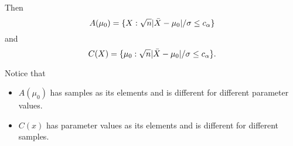\begin{itemize}
\begin{ex}
    Then
    \begin{equation*}
      A(\mu_0) = \{X : \sqrt{n} |\bar{X} - \mu_0| / \sigma \leq c_\alpha\}
    \end{equation*}
    and
    \begin{equation*}
      C(X) = \{\mu_0 : \sqrt{n} |\bar{X} - \mu_0| / \sigma \leq c_\alpha\}.
    \end{equation*}
  \end{ex}

  Notice that
  \begin{itemize}
  \item $A(\mu_0)$ has samples as its elements and is different for
    different parameter values.
  \item $C(x)$ has parameter values as its elements and is different
    for different samples.
  \end{itemize}

\end{itemize}

